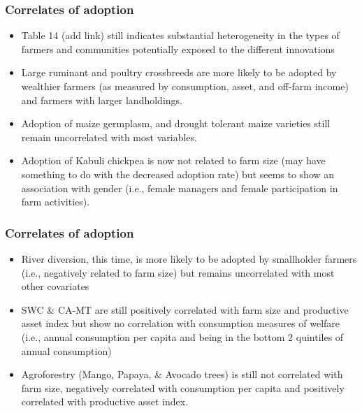 \documentclass[11pt]{beamer}
\begin{document}
\begin{frame}
\label{scndpg}
\frametitle{Correlates of adoption}
\begin{itemize}
\item Table 14 (add link) still indicates substantial heterogeneity in the types of farmers and communities potentially exposed to the different innovations

\item Large ruminant and poultry crossbreeds are more likely to be adopted by wealthier farmers (as measured by consumption, asset, and off-farm income) and farmers with larger landholdings. \hyperlink{tab14fig1}{}

\item Adoption of maize germplasm, and drought tolerant maize varieties still remain uncorrelated with most variables. 

\item Adoption of Kabuli chickpea is now not related to farm size (may have something to do with the decreased adoption rate) but seems to show an association with gender (i.e., female managers and female participation in farm activities). \hyperlink{tab14fig2}{}

\end{itemize}

\end{frame}


\begin{frame}
\label{thrdpg}
\frametitle{Correlates of adoption}
\begin{itemize}

\item River diversion, this time, is more likely to be adopted by smallholder farmers (i.e., negatively related to farm size) but remains uncorrelated with most other covariates

\item SWC \& CA-MT are still positively correlated with farm size and productive asset index but show no correlation with consumption measures of welfare (i.e., annual consumption per capita and being in the bottom 2 quintiles of annual consumption) 

\item Agroforestry (Mango, Papaya, \& Avocado trees) is still not correlated with farm size, negatively correlated with consumption per capita and positively correlated with productive asset index. 
\end{itemize}

\end{frame}
\end{document}
